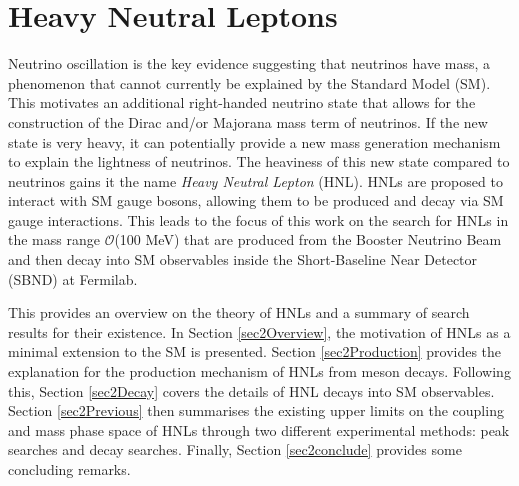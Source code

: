 
\chapter{Heavy Neutral Leptons}
\label{ChapterHNL}

\ifpdf
    \graphicspath{{Chapter2/Figs/Raster/}{Chapter2/Figs/PDF/}{Chapter2/Figs/}}
\else
    \graphicspath{{Chapter2/Figs/Vector/}{Chapter2/Figs/}}
\fi


Neutrino oscillation is the key evidence suggesting that neutrinos have mass, a phenomenon that cannot currently be explained by the Standard Model (SM).
This motivates an additional right-handed neutrino state that allows for the construction of the Dirac and/or Majorana mass term of neutrinos.
If the new state is very heavy, it can potentially provide a new mass generation mechanism to explain the lightness of neutrinos.
The heaviness of this new state compared to neutrinos gains it the name \textit{Heavy Neutral Lepton} (HNL).
HNLs are proposed to interact with SM gauge bosons, allowing them to be produced and decay via SM gauge interactions.
This leads to the focus of this work on the search for HNLs in the mass range $\mathcal{O}$(100 MeV) that are produced from the Booster Neutrino Beam and then decay into SM observables inside the Short-Baseline Near Detector (SBND) at Fermilab.

This provides an overview on the theory of HNLs and a summary of search results for their existence.  
In Section \ref{sec2Overview}, the motivation of HNLs as a minimal extension to the SM is presented.
Section \ref{sec2Production} provides the explanation for the production mechanism of HNLs from meson decays.
Following this, Section \ref{sec2Decay} covers the details of HNL decays into SM observables. 
Section \ref{sec2Previous} then summarises the existing upper limits on the coupling and mass phase space of HNLs through two different experimental methods: peak searches and decay searches.
Finally, Section \ref{sec2conclude} provides some concluding remarks.

